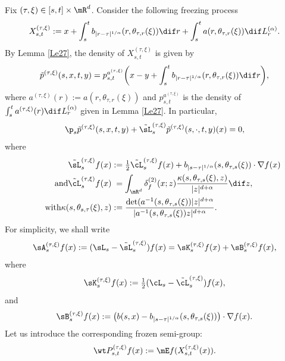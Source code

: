 Fix $(\tau,\xi)\in[s,t]\times\mR^d$. Consider the following freezing process
\[
X^{(\tau,\xi)}_{s,t}:=x+\int^t_s b_{|r-\tau|^{1/\alpha}}(r, \theta_{\tau,r}(\xi))\dif r+\int^t_s a(r, \theta_{\tau,r}(\xi))\dif L^{(\alpha)}_r.
\]
By Lemma \ref{Le27}, the density of $X^{(\tau,\xi)}_{s,t}$ is given by
\begin{equation}\label{KP8}
\tilde p^{(\tau,\xi)}(s,x,t,y)= p_{s,t}^{a^{(\tau,\xi)}}\biggl(x-y+\int^t_s b_{|r-\tau|^{1/\alpha}}(r, \theta_{\tau,r}(\xi))\dif r\biggr),
\end{equation}
where $a^{(\tau,\xi)}(r):=a(r,\theta_{\tau,r}(\xi)) $ and $p_{s,t}^{a^{(\tau,\xi)}}$ is the density of $\int^t_s a^{(\tau,\xi)}(r)\dif L^{(\alpha)}_r$
given in Lemma \ref{Le27}. In particular,
\begin{equation}\label{KOLMO_FREEZE}
\p_s \tilde p^{(\tau,\xi)}(s,x,t,y)+{\tilde \sL}^{(\tau,\xi)}_s{\tilde p}^{(\tau,\xi)}(s,\cdot,t,y)(x)=0,
\end{equation}
where
\begin{align*}
\tilde \sL^{(\tau,\xi)}_{s} f(x)&:=\tfrac 12\tilde \cL^{(\tau,\xi)}_{s} f(x)+b_{|s-\tau|^{1/\alpha}}(s, \theta_{\tau,s}(\xi))\cdot\nabla f(x)\\
\tag*{and}
\tilde \cL^{(\tau,\xi)}_{s} f(x)&\phantom{:}=\int_{\mR^d}\delta^{(2)}_f(x;z)\frac{\kappa(s,\theta_{\tau,s}(\xi),z)}{|z|^{d+\alpha}}\dif z,\\
\tag*{with}
\kappa(s,\theta_{s,\tau}(\xi),z)&:=\frac{\det(a^{-1}(s,\theta_{\tau,s}(\xi))|z|^{d+\alpha}}{|a^{-1}(s,\theta_{\tau,s}(\xi))z|^{d+\alpha}}.
\end{align*}
For simplicity, we shall write
\begin{equation*}
\sA^{(\tau,\xi)}_{s}f(x):=(\sL_{s}-\tilde \sL^{(\tau,\xi)}_{s})f(x)=\sK^{(\tau,\xi)}_{s}f(x)+\sB^{(\tau,\xi)}_{s}f(x),%
\end{equation*}
where\label{WHERE_K_B_DEFINED}
\begin{equation}\label{SM1}
\sK^{(\tau,\xi)}_{s}f(x):=\tfrac 12(\cL_{s}-\tilde \cL^{(\tau,\xi)}_{s})f(x),
\end{equation}
and
\begin{equation}\label{SM2}
\sB^{(\tau,\xi)}_{s}f(x):=\bigl(b(s,x)-b_{|s-\tau|^{1/\alpha}}(s, \theta_{\tau,s}(\xi))\bigr)\cdot\nabla f(x).
\end{equation}
Let us introduce the corresponding frozen semi-group:
\begin{equation}\label{TPT}
\wt P^{(\tau,\xi)}_{s,t}f(x):=\mE f(X^{(\tau,\xi)}_{s,t}(x)).
\end{equation}

